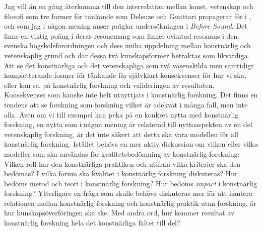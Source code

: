 \documentclass[11pt]{article}
\begin{document}
Jag vill än en gång återkomma till den interrelation mellan konst,
vetenskap och filosofi som tre former för tänkande som Deleuze och
Guattari propagerar för i , och som jag i någon
mening anser präglar undersökningen i \emph{Before Sound}. Det finns
en viktig poäng i deras resonemang som finner oväntad resonans i den
svenska högskoleförordningen och dess unika uppdelning mellan
konstnärlig och vetenskaplig grund och där dessa två kunskapsformer
betraktas som likvärdiga.
Att se det konstnärliga och det vetenskapliga som två väsenskilda men
samtidigt kompletterande former för tänkande får självklart
konsekvenser för hur vi ska, eller kan se, på konstnärlig forskning
och valideringen av resultaten. Konsekvenser som kanske inte helt
utnyttjats i konstnärlig forskning. Det finns en tendens att se
forskning som forskning vilket är adekvat i många fall, men inte
alla. Även om vi till exempel kan peka på en konkret nytta med
konstnärlig forskning, en nytta som i någon mening är relaterad till
nyttoaspekten av en del vetenskaplig forskning, är det inte säkert att
detta ska vara modellen för all konstnärlig forskning. Istället behövs
en mer aktiv diskussion om vilken eller vilka modeller som ska
användas för kvalitetsbedömning av konstnärlig forskning: Vilken roll
har den konstnärliga praktiken och utifrån vilka kriterier ska den
bedömas? I vilka forum ska kvalitet i konstnärlig forskning
diskuteras? Hur bedöms metod och teori i konstnärlig forskning? Hur
bedöms \emph{impact} i konstnärlig
forskning?  Ytterligare en fråga som skulle behöva diskuteras mer för att hantera
relationen mellan konstnärlig forskning och konstnärlig praktik utan
forskning, är hur kunskapsöverföringen ska ske. Med andra ord, hur
kommer resultat av konstnärlig forskning hela det konstnärliga fältet
till del?
\end{document}
